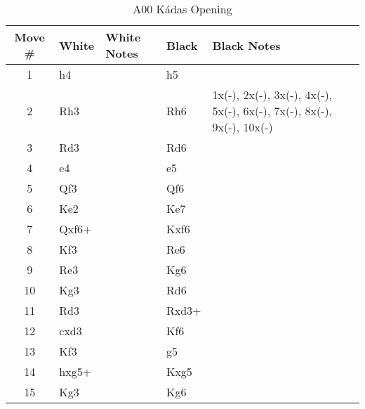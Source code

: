 \begin{table}[htbp]
\centering
\scriptsize
\caption[]{A00 Kádas Opening}
\begin{tabular}{|c|l|p{5cm}|l|p{5cm}|}
\hline
\textbf{Move \#} & \textbf{White} & \textbf{White Notes} & \textbf{Black} & \textbf{Black Notes} \\
\hline
1  & h4    &                     & h5    &                        \\
2  & Rh3   &                     & Rh6   & 1x(-), 2x(-), 3x(-), 4x(-), 5x(-), 6x(-), 7x(-), 8x(-), 9x(-), 10x(-) \\
3  & Rd3   &                     & Rd6   &                        \\
4  & e4    &                     & e5    &                        \\
5  & Qf3   &                     & Qf6   &                        \\
6  & Ke2   &                     & Ke7   &                        \\
7  & Qxf6+ &                     & Kxf6  &                        \\
8  & Kf3   &                     & Re6   &                        \\
9  & Re3   &                     & Kg6   &                        \\
10 & Kg3   &                     & Rd6   &                        \\
11 & Rd3   &                     & Rxd3+ &                        \\
12 & cxd3  &                     & Kf6   &                        \\
13 & Kf3   &                     & g5    &                        \\
14 & hxg5+ &                     & Kxg5  &                        \\
15 & Kg3   &                     & Kg6   &                        \\
\hline
\end{tabular}
\end{table}


